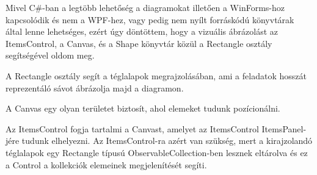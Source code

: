
Mivel C\#-ban a legtöbb lehetőség a diagramokat illetően a WinForms-hoz kapcsolódik és nem a WPF-hez, vagy pedig nem nyílt forráskódú könyvtárak által lenne lehetséges, ezért úgy döntöttem, hogy a vizuális ábrázolást az ItemsControl, a Canvas, és a Shape könyvtár közül a Rectangle osztály segítségével oldom meg.

A Rectangle osztály segít a téglalapok megrajzolásában, ami a feladatok hosszát reprezentáló sávot ábrázolja majd a diagramon.

A Canvas egy olyan területet biztosít, ahol elemeket tudunk pozícionálni.

Az ItemsControl fogja tartalmi a Canvast, amelyet az ItemsControl ItemsPanel-jére tudunk elhelyezni. Az ItemsControl-ra azért van szükség, mert a kirajzolandó téglalapok egy Rectangle típusú ObservableCollection-ben lesznek eltárolva és ez a Control a kollekciók elemeinek megjelenítését segíti.



